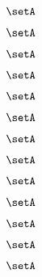 \begin{forslides}
    \begin{equation}
        \label{eq:slides-processes-74}
        \setA
    \end{equation}

    \begin{equation}
        \label{eq:slides-processes-75}
        \setA
    \end{equation}

    \begin{equation}
        \label{eq:slides-processes-76}
        \setA
    \end{equation}

    \begin{equation}
        \label{eq:slides-processes-77}
        \setA
    \end{equation}

    \begin{equation}
        \label{eq:slides-processes-78}
        \setA
    \end{equation}

    \begin{equation}
        \label{eq:slides-processes-79}
        \setA
    \end{equation}
    
    \begin{equation}
        \label{eq:slides-processes-80}
        \setA
    \end{equation}

    \begin{equation}
        \label{eq:slides-processes-81}
        \setA
    \end{equation}

    \begin{equation}
        \label{eq:slides-processes-82}
        \setA
    \end{equation}

    \begin{equation}
        \label{eq:slides-processes-83}
        \setA
    \end{equation}

    \begin{equation}
        \label{eq:slides-processes-84}
        \setA
    \end{equation}

    \begin{equation}
        \label{eq:slides-processes-85}
        \setA
    \end{equation}

    \begin{equation}
        \label{eq:slides-processes-86}
        \setA
    \end{equation}


\end{forslides}
